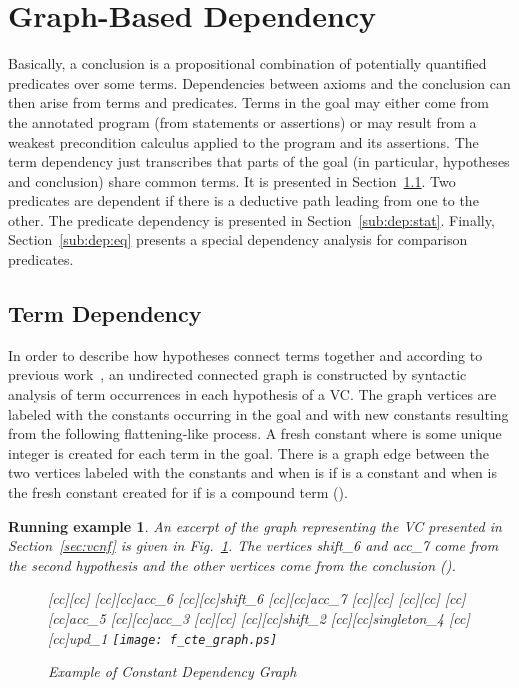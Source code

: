 \documentclass{acm_proc_article-sp}
\theoremstyle{nonumberplain}
\newtheorem{xpl}{Running example}}
\begin{document}
\section{Graph-Based Dependency}\label{sec:memorizing}
Basically, a conclusion is a propositional combination of potentially
quantified predicates over some terms. Dependencies between axioms and
the conclusion can then arise from terms and predicates. Terms in the
goal may either come from the annotated program (from statements or
assertions) or may result from a weakest precondition calculus applied
to the program and its assertions. The term dependency just transcribes
that parts of the goal (in particular, hypotheses and conclusion) share
common terms. It is presented in Section~\ref{sub:dep:dyn}. Two
predicates are dependent if there is a deductive path leading from one
to the other. The predicate dependency is presented in
Section~\ref{sub:dep:stat}. Finally, Section~\ref{sub:dep:eq} presents
a special dependency analysis for comparison predicates.



\subsection{Term Dependency}\label{sub:dep:dyn}
In order to describe how hypotheses connect terms together and
according to previous work~\cite{couchot07FTP}, an undirected connected
graph  is constructed by syntactic ana\-lysis of term occurrences
in each hypothesis of a VC. The graph vertices are labeled with the
constants occurring in the goal and with new constants resulting from
the following flattening-like process. A fresh constant  where
 is some unique integer is created for each term
 in the goal. There is a graph edge between the
two vertices labeled with the constants  and  when  is
 if  is a constant and when  is the fresh constant created
for  if  is a compound term ().



\begin{xpl}
An excerpt of the graph representing the VC presented in
Section~\ref{sec:vcnf} is given in Fig.~\ref{fig:dep_graph_var}.
The vertices \textit{shift}\_6 and \textit{acc}\_7 come from the second 
hypothesis and the other vertices come from the conclusion ().

\begin{figure}[htb!]
\begin{center}
[cc][cc]{}
[cc][cc]{\textit{acc}\_6}
[cc][cc]{\textit{shift}\_6}
[cc][cc]{\textit{acc}\_7}
[cc][cc]{}
[cc][cc]{}
[cc][cc]{\textit{acc}\_5}
[cc][cc]{\textit{acc}\_3}
[cc][cc]{}
[cc][cc]{\textit{shift}\_2}
[cc][cc]{\textit{singleton}\_4}
[cc][cc]{\textit{upd}\_1}
\texttt{[image: f\_cte\_graph.ps]}
\end{center}
\caption{Example of Constant Dependency Graph\label{fig:dep_graph_var}}
\end{figure}
\end{xpl}
\end{document}
